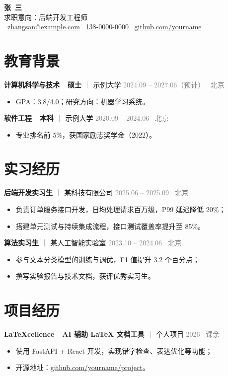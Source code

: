 \documentclass[
  UTF8,
  fontset=fandol,        %
  zihao=-4,
  a4paper,
]{ctexart}
\newcommand{\entry}[4]{%
  \textbf{#1} \textcolor{graytext}{｜} #2
  \hfill \textcolor{graytext}{#3 \, #4}\par
  \vspace{0.15em}
}
\begin{document}
\begin{center}
  {\Huge\bfseries\color{primary}张~三}\\[0.4em]
  {\large\color{graytext} 求职意向：后端开发工程师}\\[0.6em]
  \faEnvelope\ \href{mailto:zhangsan@example.com}{zhangsan@example.com} \quad
  \faPhone\ 138-0000-0000 \quad
  \faGithub\ \href{https://github.com/yourname}{github.com/yourname}
\end{center}
\vspace{-0.4em}

\section{教育背景}
\entry{计算机科学与技术~~硕士}{示例大学}{2024.09 -- 2027.06（预计）}{北京}
\begin{itemize}
  \item GPA：3.8/4.0；研究方向：机器学习系统。
\end{itemize}
\entry{软件工程~~本科}{示例大学}{2020.09 -- 2024.06}{北京}
\begin{itemize}
  \item 专业排名前 5\%，获国家励志奖学金（2022）。
\end{itemize}

\section{实习经历}
\entry{后端开发实习生}{某科技有限公司}{2025.06 -- 2025.09}{北京}
\begin{itemize}
  \item 负责订单服务接口开发，日均处理请求百万级，P99 延迟降低 20\%；
  \item 搭建单元测试与持续集成流程，接口测试覆盖率提升至 85\%。
\end{itemize}
\entry{算法实习生}{某人工智能实验室}{2023.10 -- 2024.06}{北京}
\begin{itemize}
  \item 参与文本分类模型的训练与调优，F1 值提升 3.2 个百分点；
  \item 撰写实验报告与技术文档，获评优秀实习生。
\end{itemize}

\section{项目经历}
\entry{LaTeXcellence~~AI 辅助 LaTeX 文档工具}{个人项目}{2026}{课余}
\begin{itemize}
  \item 使用 FastAPI + React 开发，实现错字检查、表达优化等功能；
  \item 开源地址：\href{https://github.com/yourname/project}{github.com/yourname/project}。
\end{itemize}
\end{document}
